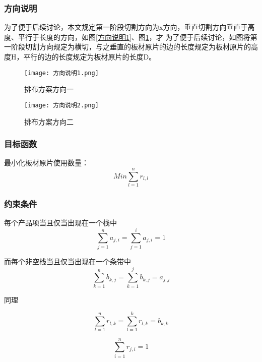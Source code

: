 \documentclass[bwprint]{gmcmthesis}
\begin{document}
\subsubsection{方向说明}
为了便于后续讨论，本文规定第一阶段切割方向为x方向，垂直切割方向垂直于高度、平行于长度的方向，如图\ref{方向说明1}、图\ref{方向说明2}，才
为了便于后续讨论，如图将第一阶段切割方向规定为横切，与之垂直的板材原片的边的长度规定为板材原片的高度H，平行的边的长度规定为板材原片的长度D。
\begin{figure}[!htbp]
    \centering
    \begin{minipage}{0.48\linewidth}
        \centering
        \texttt{[image: 方向说明1.png]}
        \caption{排布方案方向一}\label{方向说明1}
    \end{minipage}
    \begin{minipage}{0.48\linewidth}
        \centering
        \texttt{[image: 方向说明2.png]}
        \caption{排布方案方向二}\label{方向说明2}
    \end{minipage}
\end{figure}

\subsubsection{目标函数}
最小化板材原片使用数量：
\begin{equation}
    Min \sum_{l=1}^{n} r_{l,l} 
\end{equation}

\subsubsection{约束条件}
每个产品项当且仅当出现在一个栈中
\begin{equation}
    \sum_{j=1}^{n} a_{j,i}=\sum_{j=1}^{i} a_{j,i}=1
\end{equation}  

而每个非空栈当且仅当出现在一个条带中
\begin{equation}
    \sum_{k=1}^{n} b_{k,j}=\sum_{k=1}^{j} b_{k,j}=a_{j,j}
\end{equation}  

同理

\begin{equation}
    \sum_{l=1}^{n} r_{l,k}=\sum_{l=1}^{k} r_{l,k} =b_{k,k}
\end{equation}  

\begin{equation}
    \sum_{i=1}^{n} r_{j,i}=1
\end{equation}  
\end{document}

